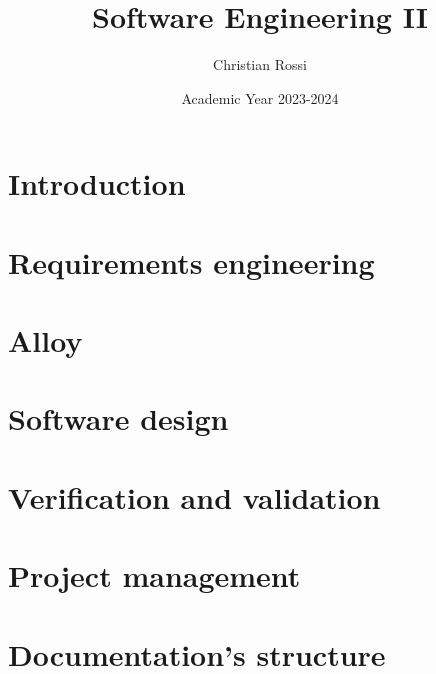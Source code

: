\documentclass[12pt, a4paper]{report}
\title{\textbf{Software Engineering II}}
\author{Christian Rossi}
\date{Academic Year 2023-2024}
\begin{document}
    \maketitle

    

    \cleardoublepage
    
    \tableofcontents

    \cleardoublepage

    \chapter{Introduction}
    
    
    
       

    \chapter{Requirements engineering}
    
    
    
      
    
    
    
     
     

    \chapter{Alloy}
    
    
    
    

    \chapter{Software design}
    
    
    
    
    
    

    \chapter{Verification and validation}
    
    
    
    

    \chapter{Project management}
    
    
    
    
    

    \chapter{Documentation's structure}
    
    
    
\end{document}
